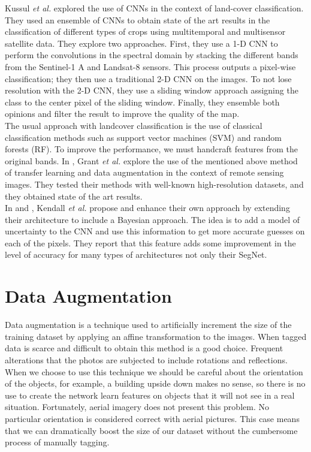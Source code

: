 Kussul \textit{et al.} \cite{7891032} explored the use of CNNs in the context of land-cover classification. They used an ensemble of CNNs to obtain state of the art results in the classification of different types of crops using multitemporal and multisensor satellite data. They explore two approaches. First, they use a 1-D CNN to perform the convolutions in the spectral domain by stacking the different bands from the Sentinel-1 A and Landsat-8 sensors. This process outputs a pixel-wise classification; they then use a traditional 2-D CNN on the images. To not lose resolution with the 2-D CNN, they use a sliding window approach assigning the class to the center pixel of the sliding window. Finally, they ensemble both opinions and filter the result to improve the quality of the map.\\

The usual approach with landcover classification is the use of classical classification methods such as support vector machines (SVM) and random forests (RF). To improve the performance, we must handcraft features from the original bands. In \cite{7858676}, Grant \textit{et al.} explore the use of the mentioned above method of transfer learning and data augmentation in the context of remote sensing images. They tested their methods with well-known high-resolution datasets, and they obtained state of the art results.\\

In \cite{DBLP:journals/corr/KendallBC15} and \cite{DBLP:journals/corr/BadrinarayananK15}, Kendall \textit{et al.} propose and enhance their own approach by extending their architecture to include a Bayesian approach. The idea is to add a model of uncertainty to the CNN and use this information to get more accurate guesses on each of the pixels. They report that this feature adds some improvement in the level of accuracy for many types of architectures not only their SegNet.\\

\section{Data Augmentation}

Data augmentation is a technique used to artificially increment the size of the training dataset by applying an affine transformation to the images. When tagged data is scarce and difficult to obtain this method is a good choice. Frequent alterations that the photos are subjected to include rotations and reflections. When we choose to use this technique we should be careful about the orientation of the objects, for example, a building upside down makes no sense, so there is no use to create the network learn features on objects that it will not see in a real situation. Fortunately, aerial imagery does not present this problem. No particular orientation is considered correct with aerial pictures. This case means that we can dramatically boost the size of our dataset without the cumbersome process of manually tagging.\\

